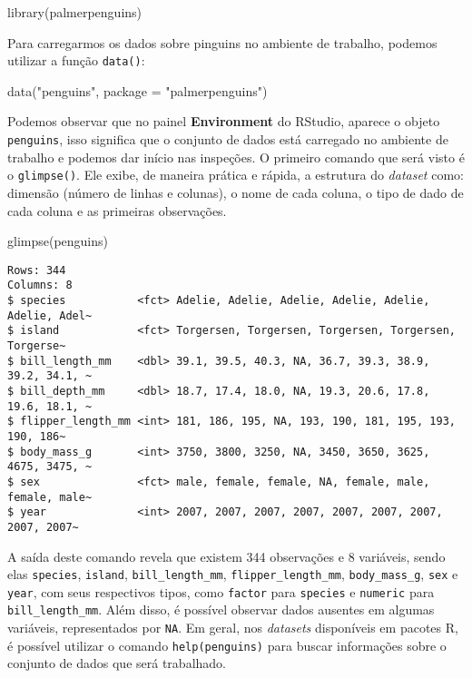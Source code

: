 \documentclass[
  12pt,
  letterpaper,
  DIV=11,
  numbers=noendperiod]{scrreprt}
\newenvironment{Shaded}{\begin{snugshade}}{\end{snugshade}}
\newcommand{\AttributeTok}[1]{\textcolor[rgb]{0.40,0.45,0.13}{#1}}
\newcommand{\FunctionTok}[1]{\textcolor[rgb]{0.28,0.35,0.67}{#1}}
\newcommand{\NormalTok}[1]{\textcolor[rgb]{0.00,0.23,0.31}{#1}}
\newcommand{\StringTok}[1]{\textcolor[rgb]{0.13,0.47,0.30}{#1}}
\begin{document}
\begin{Shaded}
\begin{Highlighting}[]
\FunctionTok{library}\NormalTok{(palmerpenguins)}
\end{Highlighting}
\end{Shaded}

\noindent Para carregarmos os dados sobre pinguins no ambiente de
trabalho, podemos utilizar a função \texttt{data()}:

\begin{Shaded}
\begin{Highlighting}[]
\FunctionTok{data}\NormalTok{(}\StringTok{"penguins"}\NormalTok{, }\AttributeTok{package =} \StringTok{"palmerpenguins"}\NormalTok{)}
\end{Highlighting}
\end{Shaded}

Podemos observar que no painel \textbf{Environment} do RStudio, aparece
o objeto \texttt{penguins}, isso significa que o conjunto de dados está
carregado no ambiente de trabalho e podemos dar início nas inspeções. O
primeiro comando que será visto é o \texttt{glimpse()}. Ele exibe, de
maneira prática e rápida, a estrutura do \emph{dataset} como: dimensão
(número de linhas e colunas), o nome de cada coluna, o tipo de dado de
cada coluna e as primeiras observações.

\begin{Shaded}
\begin{Highlighting}[]
\FunctionTok{glimpse}\NormalTok{(penguins)}
\end{Highlighting}
\end{Shaded}

\begin{verbatim}
Rows: 344
Columns: 8
$ species           <fct> Adelie, Adelie, Adelie, Adelie, Adelie, Adelie, Adel~
$ island            <fct> Torgersen, Torgersen, Torgersen, Torgersen, Torgerse~
$ bill_length_mm    <dbl> 39.1, 39.5, 40.3, NA, 36.7, 39.3, 38.9, 39.2, 34.1, ~
$ bill_depth_mm     <dbl> 18.7, 17.4, 18.0, NA, 19.3, 20.6, 17.8, 19.6, 18.1, ~
$ flipper_length_mm <int> 181, 186, 195, NA, 193, 190, 181, 195, 193, 190, 186~
$ body_mass_g       <int> 3750, 3800, 3250, NA, 3450, 3650, 3625, 4675, 3475, ~
$ sex               <fct> male, female, female, NA, female, male, female, male~
$ year              <int> 2007, 2007, 2007, 2007, 2007, 2007, 2007, 2007, 2007~
\end{verbatim}

A saída deste comando revela que existem 344 observações e 8 variáveis,
sendo elas \texttt{species}, \texttt{island}, \texttt{bill\_length\_mm},
\texttt{flipper\_length\_mm}, \texttt{body\_mass\_g}, \texttt{sex} e
\texttt{year}, com seus respectivos tipos, como \texttt{factor} para
\texttt{species} e \texttt{numeric} para \texttt{bill\_length\_mm}. Além
disso, é possível observar dados ausentes em algumas variáveis,
representados por \texttt{NA}. Em geral, nos \emph{datasets} disponíveis
em pacotes R, é possível utilizar o comando \texttt{help(penguins)} para
buscar informações sobre o conjunto de dados que será trabalhado.
\end{document}
